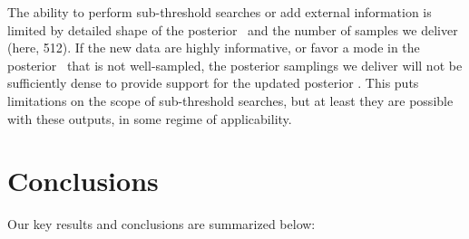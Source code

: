 \documentclass[modern]{aastex63}
\newcommand{\Kminval}{512}
\begin{document}
The ability to perform sub-threshold searches or add external information is
limited by detailed shape of the posterior \pdf\ and the number of samples we
deliver (here, \Kminval).
If the new data are highly informative, or favor a mode in the posterior \pdf\
that is not well-sampled, the posterior samplings we deliver will not be
sufficiently dense to provide support for the updated posterior \pdf.
This puts limitations on the scope of sub-threshold searches, but at least they
are possible with these outputs, in some regime of applicability.


\section{Conclusions}

Our key results and conclusions are summarized below:
\end{document}
